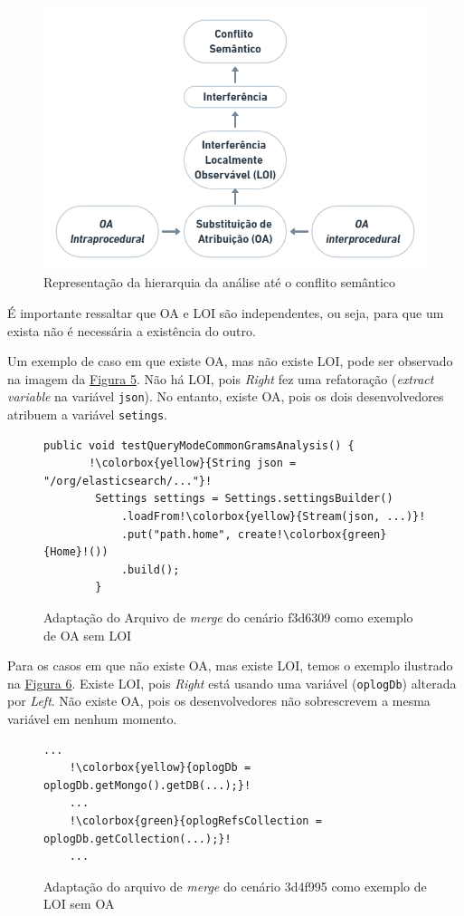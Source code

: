 \begin{figure}[!h]
    \centering
    \includegraphics[width=0.8\linewidth]{images/analysis.png}
    \caption{Representação da hierarquia da análise até o conflito semântico}
    \label{fig:analysis}
\end{figure}

É importante ressaltar que OA e LOI são independentes, ou seja, para que um exista não é necessária a existência do outro.

Um exemplo de caso em que existe OA, mas não existe LOI, pode ser observado na imagem da \hyperref[fig:f3d6309]{Figura 5}. Não há LOI, pois \emph{Right} fez uma refatoração (\emph{extract variable} na variável \texttt{json}). No entanto, existe OA, pois os dois desenvolvedores atribuem a variável \texttt{setings}.

\begin{figure}[!h]
    \begin{lstlisting}[escapechar=!]
    public void testQueryModeCommonGramsAnalysis() {
       !\colorbox{yellow}{String json = "/org/elasticsearch/..."}!
        Settings settings = Settings.settingsBuilder()
            .loadFrom!\colorbox{yellow}{Stream(json, ...)}!
            .put("path.home", create!\colorbox{green}{Home}!())
            .build();
        }
    \end{lstlisting}
    \caption{Adaptação do Arquivo de \emph{merge} do cenário f3d6309 como exemplo de OA sem LOI}
    \label{fig:f3d6309}
\end{figure}

Para os casos em que não existe OA, mas existe LOI, temos o exemplo ilustrado na \hyperref[fig:3d4f995]{Figura 6}. Existe LOI, pois \emph{Right} está usando uma variável (\texttt{oplogDb}) alterada por \emph{Left}. Não existe OA, pois os desenvolvedores não sobrescrevem a mesma variável em nenhum momento.

\begin{figure}[!h]
    \begin{lstlisting}[escapechar=!]
    ...
    !\colorbox{yellow}{oplogDb = oplogDb.getMongo().getDB(...);}!
    ...
    !\colorbox{green}{oplogRefsCollection = oplogDb.getCollection(...);}!
    ...
    \end{lstlisting}
     \caption{Adaptação do arquivo de \emph{merge} do cenário 3d4f995 como exemplo de LOI sem OA}
    \label{fig:3d4f995}
\end{figure}